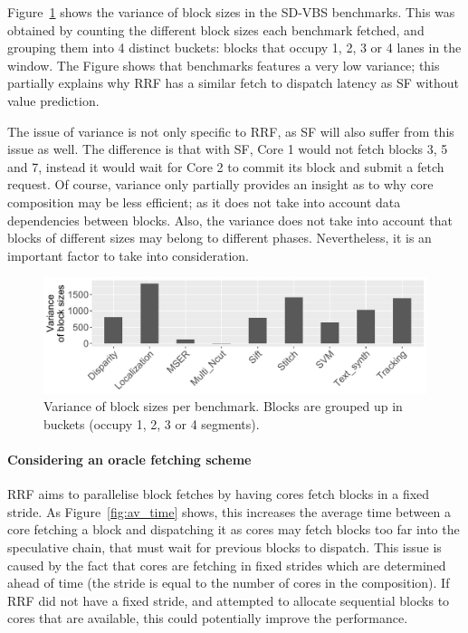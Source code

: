Figure~\ref{fig:variance} shows the variance of block sizes in the SD-VBS benchmarks.
This was obtained by counting the different block sizes each benchmark fetched, and grouping them into 4 distinct buckets: blocks that occupy 1, 2, 3 or 4 lanes in the window.
The Figure shows that benchmarks  features a very low variance; this partially explains why RRF has a similar fetch to dispatch latency as SF without value prediction.

The issue of variance is not only specific to RRF, as SF will also suffer from this issue as well.
The difference is that with SF, Core 1 would not fetch blocks 3, 5 and 7, instead it would wait for Core 2 to commit its block and submit a fetch request.
Of course, variance only partially provides an insight as to why core composition may be less efficient; as it does not take into account data dependencies between blocks.
Also, the variance does not take into account that blocks of different sizes may belong to different phases.
Nevertheless, it is an important factor to take into consideration.

\begin{figure}[t]
    \centering
    \includegraphics[width=1\textwidth]{chapter3/graphics/variance.pdf}
    \caption{Variance of block sizes per benchmark. Blocks are grouped up in buckets (occupy 1, 2, 3 or 4 segments).}
    \label{fig:variance}
	\vspace{1em}
\end{figure}



\paragraph*{Considering an oracle fetching scheme}

RRF aims to parallelise block fetches by having cores fetch blocks in a fixed stride.
As Figure~\ref{fig:av_time} shows, this increases the average time between a core fetching a block and dispatching it as cores may fetch blocks too far into the speculative chain, that must wait for previous blocks to dispatch.
This issue is caused by the fact that cores are fetching in fixed strides which are determined ahead of time (the stride is equal to the number of cores in the composition).
If RRF did not have a fixed stride, and attempted to allocate sequential blocks to cores that are available, this could potentially improve the performance. 

